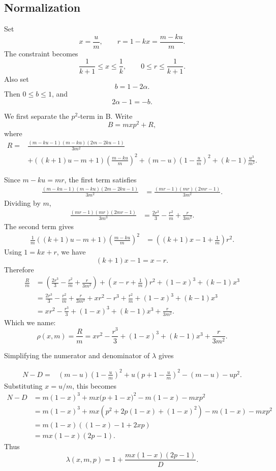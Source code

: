 \documentclass[11pt]{article}
\begin{document}
\subsection{Normalization}

Set
\[
        x=\frac{u}{m}, \qquad r=1-kx=\frac{m-ku}{m}.
\]
The constraint becomes
\[
        \frac{1}{k+1}\leq x\leq \frac1k,
        \qquad 0\leq r\leq \frac{1}{k+1}.
\]
Also set
\[
        b=1-2\alpha.
\]
Then \(0\leq b\leq 1\), and
\[
        2\alpha-1=-b.
\]

We first separate the \(p^2\)-term in B. Write
\[
        B=mxp^2+R,
\]
where
\[
\begin{aligned}
R={}&
\frac{(m-ku-1)(m-ku)(2m-2ku-1)}{3m^2}  \\
&+\left((k+1)u-m+1\right)\left(\frac{m-ku}{m}\right)^2
+(m-u)\left(1-\frac um\right)^2
+(k-1)\frac{u^3}{m^2}.
\end{aligned}
\]

Since \(m-ku=mr\), the first term satisfies
\[
\begin{aligned}
\frac{(m-ku-1)(m-ku)(2m-2ku-1)}{3m^2}
&=
\frac{(mr-1)(mr)(2mr-1)}{3m^2}.
\end{aligned}
\]
Dividing by \(m\),
\[
\begin{aligned}
\frac{(mr-1)(mr)(2mr-1)}{3m^3}
&=
\frac{2r^3}{3}-\frac{r^2}{m}+\frac{r}{3m^2}.
\end{aligned}
\]
The second term gives
\[
\begin{aligned}
\frac{1}{m}
\left((k+1)u-m+1\right)\left(\frac{m-ku}{m}\right)^2
&=
\left((k+1)x-1+\frac1m\right)r^2.
\end{aligned}
\]
Using \(1=kx+r\), we have
\[
        (k+1)x-1=x-r.
\]
Therefore
\[
\begin{aligned}
\frac{R}{m}
&=
\left(\frac{2r^3}{3}-\frac{r^2}{m}+\frac{r}{3m^2}\right)
+
\left(x-r+\frac1m\right)r^2
+(1-x)^3
+(k-1)x^3 \\
&=
\frac{2r^3}{3}-\frac{r^2}{m}+\frac{r}{3m^2}
+xr^2-r^3+\frac{r^2}{m}
+(1-x)^3
+(k-1)x^3 \\
&=
xr^2-\frac{r^3}{3}
+(1-x)^3
+(k-1)x^3
+\frac{r}{3m^2}.
\end{aligned}
\]
Which we name:
\[
        \rho(x,m)
        =
        \frac{R}{m}
        =
        xr^2-\frac{r^3}{3}
        +(1-x)^3
        +(k-1)x^3
        +\frac{r}{3m^2}.
\]

Simplifying the numerator and denominator of \(\lambda\) gives

\[
\begin{aligned}
N-D
={}&
(m-u)\left(1-\frac um\right)^2
+u\left(p+1-\frac um\right)^2
-(m-u)-up^2.
\end{aligned}
\]
Substituting \(x=u/m\), this becomes
\[
\begin{aligned}
N-D
&=
m(1-x)^3
 +mx\bigl(p+1-x\bigr)^2
 -m(1-x)-mxp^2 \\
&=
m(1-x)^3
 +mx\left(p^2+2p(1-x)+(1-x)^2\right)
 -m(1-x)-mxp^2 \\
&=
m(1-x)\left((1-x)-1+2xp\right) \\
&=
mx(1-x)(2p-1).
\end{aligned}
\]
Thus
\[
        \lambda(x,m,p)=1+\frac{mx(1-x)(2p-1)}{D}.
\]
\end{document}
